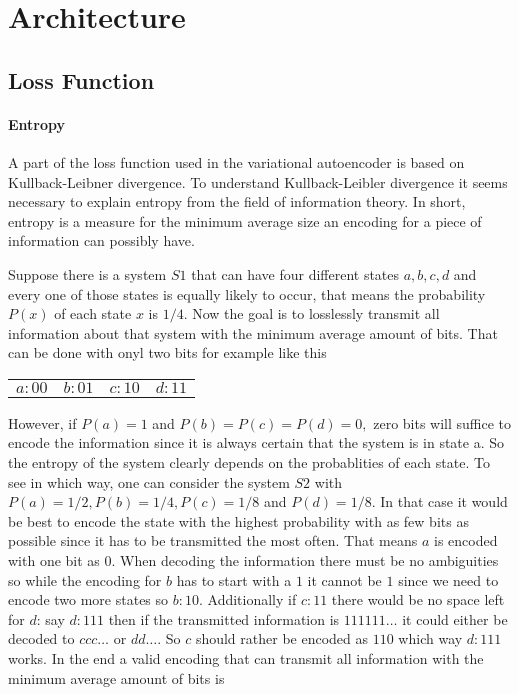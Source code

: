 \section{Architecture}
\subsection{Loss Function}

\paragraph{Entropy}\mbox{}

A part of the loss function used in the variational autoencoder is based on Kullback-Leibner divergence.
To understand Kullback-Leibler divergence it seems necessary to explain entropy from
the field of information theory. In short, entropy is a measure for the minimum average size an
encoding for a piece of information can possibly have.

Suppose there is a system $S1$ that can have four different states $a, b, c, d$
and every one of those states is equally likely to occur, that means the probability $P(x)$
of each state $x$ is $1/4$. Now the goal is to losslessly transmit all information about that system
with the minimum average amount of bits. That can be done with onyl two bits for example like this

\begin{center}
    \begin{tabular} {c c c c}
        $a: 00$ & $b: 01$ & $c: 10$ & $d: 11$
    \end{tabular}
\end{center}

However, if $P(a)=1$ and $P(b)=P(c)=P(d)=0,$ zero bits will suffice to encode the information since
it is always certain that the system is in state a. So the entropy of the system clearly depends on
the probablities of each state. To see in which way, one can consider the system $S2$ with 
$P(a)=1/2, P(b)=1/4, P(c)=1/8$ and $P(d)=1/8$. In that case it would be best to encode the state
with the highest probability with as few bits as possible since it has to be transmitted the most
often. That means $a$ is encoded with one bit as $0$. When decoding the information there must be
no ambiguities so while the encoding for $b$ has to start with a $1$ it cannot be $1$ since we need 
to encode two more states so $b: 10$. Additionally if $c: 11$ there would be no space left for $d$:
say $d: 111$ then if the transmitted information is $111111\dots$ it could either be decoded to
$ccc\dots$ or $dd\dots$. So $c$ should rather be encoded as $110$ which way $d: 111$ works. In the end a valid
encoding that can transmit all information with the minimum average amount of bits is


